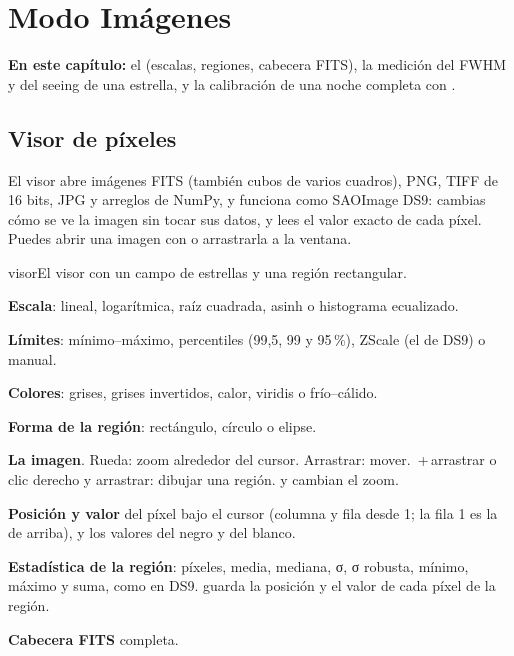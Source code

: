 \chapter{Modo Imágenes}\label{cap:imagenes}

\begin{resumen}
\textbf{En este capítulo:} el  (escalas, regiones, cabecera FITS), la medición del FWHM y del
seeing de una estrella, y la calibración de una noche completa con .
\end{resumen}

\section{Visor de píxeles}\label{sec:visor}

El visor abre imágenes FITS (también cubos de varios cuadros), PNG, TIFF de 16 bits, JPG y arreglos de NumPy, y funciona
como SAOImage DS9: cambias cómo se ve la imagen sin tocar sus datos, y lees el valor exacto de cada píxel. Puedes abrir
una imagen con  o arrastrarla a la ventana.

\begin{capturam}{visor}{El visor con un campo de estrellas y una región rectangular.}
\item \textbf{Escala}: lineal, logarítmica, raíz cuadrada, asinh o histograma ecualizado.
\item \textbf{Límites}: mínimo–máximo, percentiles (99,5, 99 y 95\,\%), ZScale (el de DS9) o manual.
\item \textbf{Colores}: grises, grises invertidos, calor, viridis o frío–cálido.
\item \textbf{Forma de la región}: rectángulo, círculo o elipse.
\item \textbf{La imagen}. Rueda: zoom alrededor del cursor. Arrastrar: mover. \,+\,arrastrar o clic derecho
y arrastrar: dibujar una región.  y  cambian el zoom.
\item \textbf{Posición y valor} del píxel bajo el cursor (columna y fila desde 1; la fila 1 es la de arriba), y los
valores del negro y del blanco.
\item \textbf{Estadística de la región}: píxeles, media, mediana, σ, σ robusta, mínimo, máximo y suma, como en DS9.
 guarda la posición y el valor de cada píxel de la región.
\item \textbf{Cabecera FITS} completa.
\end{capturam}

